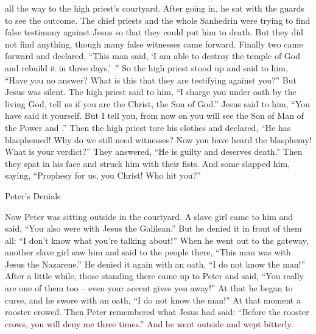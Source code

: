 {all the way to
the high priest’s
courtyard.
After
going
in,
he sat
with
the guards
to see
the outcome.
The chief priests
and
the whole
Sanhedrin
were trying to find
false testimony
against
Jesus
so
that they could put
him
to death.
But
they did
not
find
anything, though many
false witnesses
came forward. Finally two came forward
and declared,
“This man
said,
‘I am able
to destroy
the temple
of God
and
rebuild
it in
three
days.’ ”
So
the high priest
stood up
and said
to him,
“Have you
no
answer? What
is this
that they are testifying against
you?”
But
Jesus
was silent.
The high priest
said
to him,
“I charge
you
under oath
by
the living
God,
tell
us
if
you
are
the Christ,
the Son
of God.”
Jesus
said
to him,
“You
have said
it yourself. But
I tell
you,
from
now on
you will see
the Son
of Man
{}
of the Power
and
{}.”
Then
the high priest
tore
his
clothes
and declared, “He has blasphemed! Why
do we
still
need
witnesses? Now
you have heard
the blasphemy!
What
is
your
verdict?” They answered,
“He is
guilty
and deserves death.”
Then
they spat
in
his
face
and
struck him with their
fists.
And
some slapped him,
saying,
“Prophesy
for us,
you Christ! Who
hit
you?”
\par }{\SH Peter’s Denials
\par }{\PP {}Now
Peter
was sitting
outside
in
the courtyard.
A
slave girl
came
to him
and
said,
“You
also were
with
Jesus
the Galilean.”
But
he denied
it in front of
them all: “I
don’t
know
what
you’re talking about!”
When
he went out
to
the gateway,
another slave girl
saw
him
and
said
to the people there,
“This man
was
with
Jesus
the Nazarene.”
He
denied
it again
with
an oath,
“I do
not
know
the man!”
After
a little
while,
those standing
there came up
to Peter
and said,
“You
really
are
one of
them too – even your accent gives you away!”
At that
he began
to curse,
and
he swore
with an oath, “I do
not
know
the man!” At that moment
a rooster
crowed.
Then
Peter
remembered
what Jesus
had said: “Before the rooster
crows,
you will deny
me
three times.”
And
he went
outside
and wept
bitterly.

}
